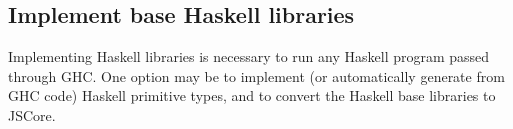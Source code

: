 \subsection{Implement base Haskell libraries}

Implementing Haskell libraries is necessary to run any Haskell program passed 
through GHC. One option may be to implement (or automatically generate from GHC code) Haskell
primitive types, and to convert the Haskell base libraries to JSCore.

\begin{comment}
\subsection{Map GHC encoded Types to Haskell-Python}

Figure out how to create encoded types for Haskell-Python. It may be possible to
autogenerate these from GHC files.

"2.) understanding how GHC encodes types. The Core Haskell of the previous steps encodes the types of all functions in slightly low-level
ways. This needs to be understood and a mapping of these types to what
the Python Haskell interpreter provides needs to be written." 

\subsection{Set up GHC test environment for Haskell-Python}

Setting up the GHC test environment for Haskell-Python would be very valuable
for development and bug fixing.

"3.) the actual interpretation of the Core language is mostly
implemented. There are probably some things missing, which will be
discovered by running some Haskell programs. For that end, it would be
good to find out whether there is a Haskell implementation test suite
and get it to run."

\subsection{Add built in Haskell types to run some Haskell benchmarks}

"4.) what is missing to run more non-pure Haskell programs are all the
built-in functions (e.g. those that perform arithmetic, I/O, call C
functions, etc) and built-in types (e.g. integers, floats, C-level types
like arrays and structs). These should be added step by step. This is an
essentially open-ended task. It would be good to add as many built-ins
so that some of the Haskell benchmarks can run."


\end{comment}
